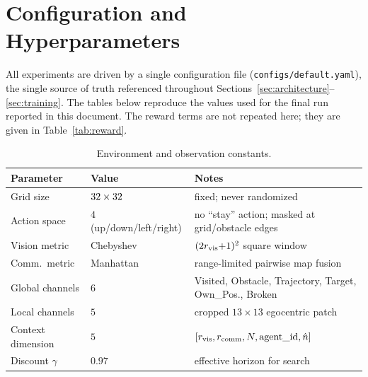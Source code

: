 
\section{Configuration and Hyperparameters}
\label{app:config}

All experiments are driven by a single configuration file
(\texttt{configs/default.yaml}), the single source of truth referenced
throughout Sections~\ref{sec:architecture}--\ref{sec:training}. The tables
below reproduce the values used for the final run reported in this document.
The reward terms are not repeated here; they are given in
Table~\ref{tab:reward}.

\begin{table}[h]
\centering
\footnotesize
\begin{tabular}{lll}
\toprule
\textbf{Parameter} & \textbf{Value} & \textbf{Notes} \\
\midrule
Grid size            & $32\times32$ & fixed; never randomized \\
Action space         & $4$ (up/down/left/right)   & no ``stay'' action; masked at grid/obstacle edges \\
Vision metric        & Chebyshev                  & $(2r_{\mathrm{vis}}{+}1)^2$ square window \\
Comm.\ metric        & Manhattan                  & range-limited pairwise map fusion \\
Global channels      & $6$                        & Visited, Obstacle, Trajectory, Target, Own\_Pos., Broken \\
Local channels       & $5$                        & cropped $13\times13$ egocentric patch \\
Context dimension    & $5$                        & $[r_{\mathrm{vis}}, r_{\mathrm{comm}}, N, \text{agent\_id}, \hat n]$ \\
Discount $\gamma$    & $0.97$                     & effective horizon for search \\
\bottomrule
\end{tabular}
\caption{Environment and observation constants.}
\label{tab:app-env}
\end{table}

